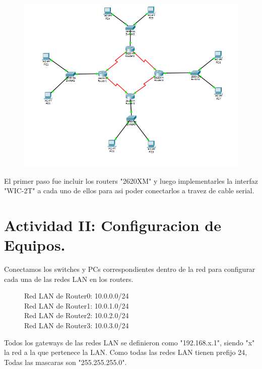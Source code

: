 \documentclass[spanish]{udpreport}
\begin{document}
\begin{figure}[H]
\begin{center}
\includegraphics[scale=0.83]{images/Topologia.PNG}
\end{center}
\end{figure}
El primer paso fue incluir los routers "2620XM" y luego implementarles la interfaz "WIC-2T" a cada uno de ellos para asi poder conectarlos a travez de cable serial.

\vspace{16cm}



\section{Actividad II: Configuracion de Equipos.}

Conectamos los switches y PCs correspondientes dentro de la red para configurar cada una de las redes LAN en los routers.\\
\begin{figure}[H]
\begin{center}
Red LAN de Router0: 10.0.0.0/24\\
Red LAN de Router1: 10.0.1.0/24\\
Red LAN de Router2: 10.0.2.0/24\\
Red LAN de Router3: 10.0.3.0/24
\end{center}
\end{figure}
Todos los gateways de las redes LAN se definieron como "192.168.x.1", siendo "x" la red a la que pertenece la LAN. Como todas las redes LAN tienen prefijo 24, Todas las mascaras son "255.255.255.0".\\
\end{document}
